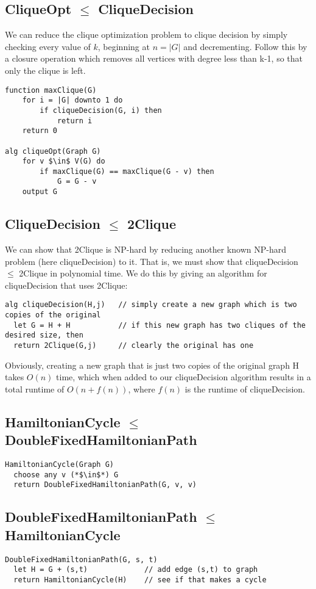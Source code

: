 \documentclass[12pt]{article}
\providecommand{\reducible}[2]{
  \textbf{#1} $\leq$ \textbf{#2}
}
\begin{document}
\subsection{\reducible{CliqueOpt}{CliqueDecision}}
We can reduce the clique optimization problem to clique decision by simply checking every value of $k$,
beginning at $n = |G|$ and decrementing.
Follow this by a closure operation which removes all vertices with degree less than k-1,
so that only the clique is left.
\begin{lstlisting}
function maxClique(G)
    for i = |G| downto 1 do
        if cliqueDecision(G, i) then
            return i
    return 0

alg cliqueOpt(Graph G)
    for v $\in$ V(G) do
        if maxClique(G) == maxClique(G - v) then
            G = G - v
    output G
\end{lstlisting}

\subsection{\reducible{CliqueDecision}{2Clique}}
We can show that 2Clique is NP-hard by reducing another known NP-hard problem (here cliqueDecision) to it.
That is, we must show that cliqueDecision $\leq$ 2Clique in polynomial time.
We do this by giving an algorithm for cliqueDecision that uses 2Clique:
\begin{lstlisting}
alg cliqueDecision(H,j)   // simply create a new graph which is two copies of the original
  let G = H + H           // if this new graph has two cliques of the desired size, then
  return 2Clique(G,j)     // clearly the original has one
\end{lstlisting}
Obviously, creating a new graph that is just two copies of the original graph H takes $O(n)$ time, which when added to our cliqueDecision algorithm results in a total runtime of $O(n + f(n))$, where $f(n)$ is the runtime of cliqueDecision.


\subsection{\reducible{HamiltonianCycle}{DoubleFixedHamiltonianPath}}
\begin{lstlisting}
HamiltonianCycle(Graph G)
  choose any v (*$\in$*) G
  return DoubleFixedHamiltonianPath(G, v, v)
\end{lstlisting}

\subsection{\reducible{DoubleFixedHamiltonianPath}{HamiltonianCycle}}
\begin{lstlisting}
DoubleFixedHamiltonianPath(G, s, t)
  let H = G + (s,t)             // add edge (s,t) to graph
  return HamiltonianCycle(H)    // see if that makes a cycle
\end{lstlisting}
\end{document}
